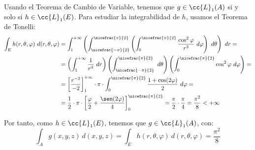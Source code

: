 \begin{ejercicio}
    Usando el Teorema de Cambio de Variable, tenemos que $g\in \cc{L}_1(A)$ si y solo si $h\in \cc{L}_1(E)$. Para estudiar la integrabilidad de $h$, usamos el Teorema de Tonelli:
    \begin{align*}
        \int_E h(r, \theta, \varphi)~d(r, \theta, \varphi) &=
        \int_1^{+\infty} \left( \int_{\nicefrac{-\pi}{2}}^{\nicefrac{\pi}{2}} \left( \int_0^{\nicefrac{\pi}{2}} \dfrac{\cos^2\varphi}{r^3}~d\varphi \right)~d\theta \right)~dr =\\
        &= \left(\int_1^{+\infty} \dfrac{1}{r^3}~dr\right) \left(\int_{\nicefrac{-\pi}{2}}^{\nicefrac{\pi}{2}}~d\theta\right) \left(\int_0^{\nicefrac{\pi}{2}} \cos^2\varphi~d\varphi\right) =\\
        &= \left[\dfrac{r^{-2}}{-2}\right]_1^{+\infty} \cdot \pi \cdot \int_0^{\nicefrac{\pi}{2}} \dfrac{1+\cos(2\varphi)}{2}~d\varphi =\\
        &= \dfrac{1}{2} \cdot \pi \cdot \left[\dfrac{\varphi}{2} + \dfrac{\sen(2\varphi)}{4}\right]_0^{\nicefrac{\pi}{2}} = \dfrac{\pi}{2} \cdot \dfrac{\pi}{4} = \dfrac{\pi^2}{8} < +\infty
    \end{align*}

    Por tanto, como $h\in \cc{L}_1(E)$, tenemos que $g\in \cc{L}_1(A)$, con:
    \begin{equation*}
        \int_A g(x, y, z)~d(x, y, z) = \int_E h(r, \theta, \varphi)~d(r, \theta, \varphi) = \dfrac{\pi^2}{8}
    \end{equation*}
\end{ejercicio}


